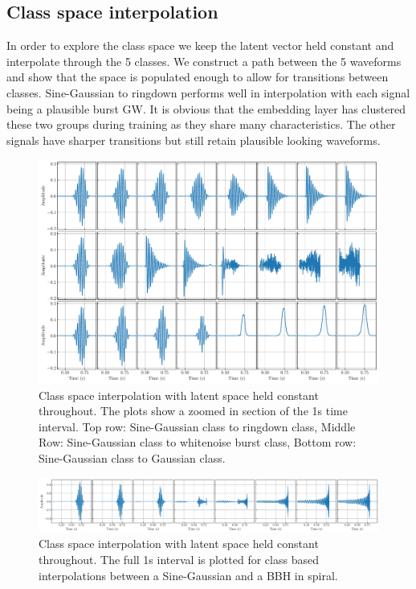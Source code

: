 \documentclass[12pt]{iopart}
\begin{document}
\subsection{Class space interpolation}
In order to explore the class space we keep the latent vector held constant and interpolate through the 5 classes. We construct a path between the 5 waveforms and show that the space is populated enough to allow for transitions between classes. Sine-Gaussian to ringdown performs well in interpolation with each signal being a plausible burst GW. It is obvious that the embedding layer has clustered these two groups during training as they share many characteristics. The other signals have sharper transitions but still retain plausible looking waveforms.  

\begin{figure}
    \centering
    \includegraphics[width=\textwidth]{figures/4_c_interp.pdf}
    \caption{Class space interpolation with latent space held constant throughout. The plots show a zoomed in section of the 1s time interval. Top row: Sine-Gaussian class to ringdown class, Middle Row: Sine-Gaussian class to whitenoise burst class, Bottom row: Sine-Gaussian class to Gaussian class.}
    \label{fig:c_interp}
\end{figure}

\begin{figure}
    \centering
    \includegraphics[width=\textwidth]{figures/sg_bbh_interp.pdf}
    \caption{Class space interpolation with latent space held constant throughout. The full 1s interval is plotted for class based interpolations between a Sine-Gaussian and a BBH in spiral.}
    \label{fig:sgbbh_interp}
\end{figure}
\end{document}

